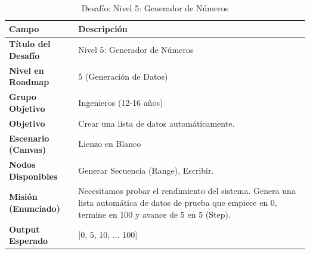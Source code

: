 \begin{table}[H]
    \centering
    \caption{Desafío: Nivel 5: Generador de Números}
    \label{tab:desafio-ing-5}
    \begingroup
    \renewcommand{\arraystretch}{\TableRowStretch}
    \begin{tabularx}{\textwidth}{ l X }
        \hline
        \textbf{Campo}              & \textbf{Descripción}                                                                                                                                      \\
        \hline
        \textbf{Título del Desafío} & Nivel 5: Generador de Números                                                                                                                             \\
        \textbf{Nivel en Roadmap}   & 5 (Generación de Datos)                                                                                                                                   \\
        \textbf{Grupo Objetivo}     & Ingenieros (12-16 años)                                                                                                                                   \\
        \textbf{Objetivo}           & Crear una lista de datos automáticamente.                                                                                                                 \\
        \textbf{Escenario (Canvas)} & Lienzo en Blanco                                                                                                                                          \\
        \textbf{Nodos Disponibles}  & Generar Secuencia (Range), Escribir.                                                                                                                      \\
        \textbf{Misión (Enunciado)} & Necesitamos probar el rendimiento del sistema. Genera una lista automática de datos de prueba que empiece en 0, termine en 100 y avance de 5 en 5 (Step). \\
        \textbf{Output Esperado}    & [0, 5, 10, ... 100]                                                                                                                                       \\
        \hline
    \end{tabularx}
    \endgroup
\end{table}

